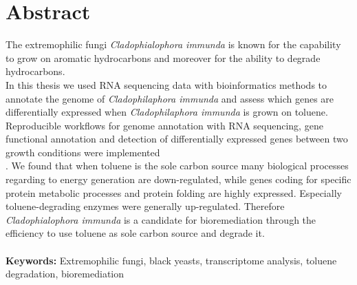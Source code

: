 \documentclass[12pt, a4paper]{report}
\begin{document}
\section*{Abstract}
The extremophilic fungi \textit{Cladophialophora immunda} is known for
the capability to grow on aromatic hydrocarbons and moreover for the
ability to degrade hydrocarbons.\\ In this thesis we used RNA
sequencing data with bioinformatics methods to annotate the genome of \textit{Cladophilaphora
  immunda} and assess which genes are differentially expressed when
\textit{Cladophilaphora immunda} is grown on toluene. 
Reproducible workflows for genome annotation with RNA sequencing, gene
functional annotation and detection of differentially expressed genes
between two growth conditions were implemented\\. 
We found that when toluene is the sole carbon source many biological
processes regarding to energy generation are down-regulated, while
genes coding for specific protein metabolic processes and protein
folding are highly expressed. Especially toluene-degrading enzymes
were generally up-regulated. Therefore \textit{Cladophialophora
  immunda} is a candidate for bioremediation through the efficiency to
use toluene as sole carbon source and degrade it. \\ 
\ \\ \textbf{Keywords:} Extremophilic fungi, black
yeasts, transcriptome analysis, toluene degradation, bioremediation 
\newpage
\end{document}
